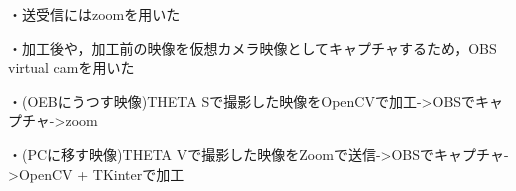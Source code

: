 ・送受信にはzoomを用いた

・加工後や，加工前の映像を仮想カメラ映像としてキャプチャするため，OBS virtual camを用いた

・(OEBにうつす映像)THETA Sで撮影した映像をOpenCVで加工->OBSでキャプチャ->zoom

・(PCに移す映像)THETA Vで撮影した映像をZoomで送信->OBSでキャプチャ->OpenCV + TKinterで加工